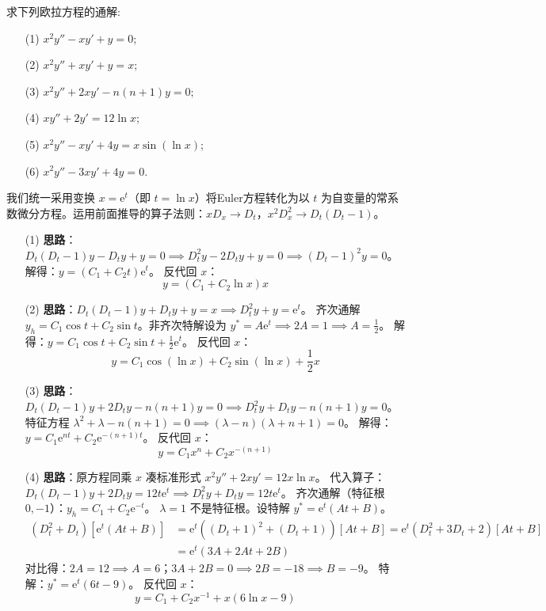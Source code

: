 \documentclass[lang=cn,11pt]{elegantbook}
\begin{document}
\begin{exercise}[Euler方程求解]
求下列欧拉方程的通解:
\begin{enumerate}
    \item[(1)] $x^2y''-xy'+y=0$;
    \item[(2)] $x^2y''+xy'+y=x$;
    \item[(3)] $x^2y''+2xy'-n(n+1)y=0$;
    \item[(4)] $xy''+2y'=12\ln x$;
    \item[(5)] $x^2y''-xy'+4y=x\sin(\ln x)$;
    \item[(6)] $x^2y''-3xy'+4y=0$.
\end{enumerate}
\end{exercise}
\begin{solution}
我们统一采用变换 $x = \mathrm{e}^t$（即 $t = \ln x$）将Euler方程转化为以 $t$ 为自变量的常系数微分方程。运用前面推导的算子法则：$xD_x \to D_t$，$x^2 D_x^2 \to D_t(D_t-1)$。
\begin{enumerate}
    \item[(1)] \textbf{思路}：$D_t(D_t-1)y - D_t y + y = 0 \implies D_t^2 y - 2D_t y + y = 0 \implies (D_t-1)^2 y = 0$。
    解得：$y = (C_1 + C_2 t)\mathrm{e}^t$。
    反代回 $x$：
    \[
    y = (C_1 + C_2\ln x)x
    \]
    
    \item[(2)] \textbf{思路}：$D_t(D_t-1)y + D_t y + y = x \implies D_t^2 y + y = \mathrm{e}^t$。
    齐次通解 $y_h = C_1\cos t + C_2\sin t$。非齐次特解设为 $y^* = A\mathrm{e}^t \implies 2A=1 \implies A=\frac{1}{2}$。
    解得：$y = C_1\cos t + C_2\sin t + \frac{1}{2}\mathrm{e}^t$。
    反代回 $x$：
    \[
    y = C_1\cos(\ln x) + C_2\sin(\ln x) + \frac{1}{2}x
    \]
    
    \item[(3)] \textbf{思路}：$D_t(D_t-1)y + 2D_t y - n(n+1)y = 0 \implies D_t^2 y + D_t y - n(n+1)y = 0$。
    特征方程 $\lambda^2 + \lambda - n(n+1) = 0 \implies (\lambda-n)(\lambda+n+1) = 0$。
    解得：$y = C_1\mathrm{e}^{nt} + C_2\mathrm{e}^{-(n+1)t}$。
    反代回 $x$：
    \[
    y = C_1 x^n + C_2 x^{-(n+1)}
    \]
    
    \item[(4)] \textbf{思路}：原方程同乘 $x$ 凑标准形式 $x^2 y'' + 2xy' = 12x\ln x$。
    代入算子：$D_t(D_t-1)y + 2D_t y = 12t\mathrm{e}^t \implies D_t^2 y + D_t y = 12t\mathrm{e}^t$。
    齐次通解（特征根 $0, -1$）：$y_h = C_1 + C_2\mathrm{e}^{-t}$。
    $\lambda=1$ 不是特征根。设特解 $y^* = \mathrm{e}^t(At+B)$。
    \begin{align*}
    (D_t^2+D_t)[\mathrm{e}^t(At+B)] &= \mathrm{e}^t((D_t+1)^2+(D_t+1))[At+B] = \mathrm{e}^t(D_t^2+3D_t+2)[At+B] \\
    &= \mathrm{e}^t(3A+2At+2B)
    \end{align*}
    对比得：$2A=12 \implies A=6$；$3A+2B=0 \implies 2B=-18 \implies B=-9$。
    特解：$y^* = \mathrm{e}^t(6t-9)$。
    反代回 $x$：
    \[
    y = C_1 + C_2 x^{-1} + x(6\ln x - 9)
    \]
    

\end{enumerate}
\end{solution}
\end{document}
